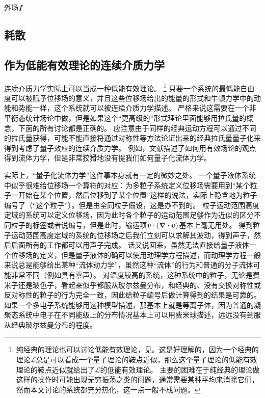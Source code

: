 外场$\vb*{f}$

\subsection{耗散}

\subsection{作为低能有效理论的连续介质力学}

连续介质力学实际上可以当成一种低能有效理论。%
\footnote{
    纯经典的理论也可以讨论低能有效理论，见\cite{reall2021effective}。这是好理解的，因为一个经典的理论$\mathcal{L}$总是可以看成一个量子理论的鞍点近似，那么这个量子理论的低能有效理论的鞍点近似就给出了$\mathcal{L}$的低能有效理论。
    主要的困难在于纯经典的理论做这样的操作时可能出现无穷振荡之类的问题，通常需要某种平均来消除它们，然而本文讨论的系统都充分热化，这一点一般不成问题。
}%
只要一个系统的最低能自由度可以被赋予位移场的意义，并且这些位移场给出的能量的形式和牛顿力学中的动能和势能一样，这个系统就可以被连续介质力学描述。
严格来说这需要在一个非平衡态统计场论中做，但是如果这个“更高级的”形式理论里面能够用拉氏量的概念，下面的所有讨论都是正确的。
应注意由于同样的经典运动方程可以通过不同的拉氏量获得，可能不能直接将通过对称性等方法论证出来的经典拉氏量量子化来得到考虑了量子效应的连续介质力学。
例如，文献\cite{eft-fluid-rel}描述了如何用有效场论的观点得到流体力学，但是非常狡猾地没有提我们如何量子化流体力学。

实际上，“量子化流体力学”这件事本身就有一定的微妙之处。
一个量子液体系统中似乎很难给位移场一个算符的对应：为多粒子系统定义位移场需要用到“某个粒子一开始在某个位置，然后位移到了某个位置”这样的说法，实际上隐含地为粒子编号了（“这个粒子”）。但是由全同粒子假设，这是办不到的。
粒子运动范围高度定域的系统可以定义位移场，因为此时各个粒子的运动范围足够作为近似的区分不同粒子的标签或者说编号，但是此时，输运项$\vb*{v} \cdot (\div{\vb*{v}})$基本上毫无用处。
得到粒子运动范围高度定域的系统的位移场之后我们立刻可以求解其波动，得到声子，然后后面所有的工作都可以用声子完成。
话又说回来，虽然无法直接给量子液体一个位移场的定义，但是量子液体的确可以使用动理学方程描述，而动理学方程一般来说总是能够给出某种“流体动力学”，虽然这种“流体”的行为和普通的分子流体可能非常不同（例如具有零声）。
对温度较高的系统，这种系统中的粒子，无论是费米子还是玻色子，看起来似乎都服从玻尔兹曼分布，和经典的、没有交换对称性或反对称性的粒子的行为完全一致，因此给粒子编号后做计算得到的结果是可靠的。
如果一个多电子系统能够用这种模型描述，那基本上就是等离子体，因为普通的凝聚态系统中电子在不同能级上的分布情况基本上可以用费米球描述，远远没有到服从经典玻尔兹曼分布的程度。

